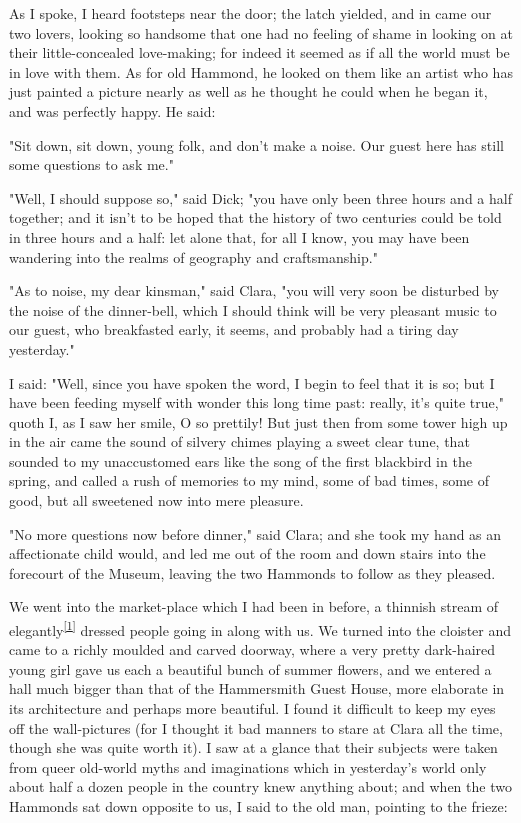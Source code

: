 As I spoke, I heard footsteps near the door; the latch yielded, and in
came our two lovers, looking so handsome that one had no feeling of
shame in looking on at their little-concealed love-making; for indeed it
seemed as if all the world must be in love with them. As for old
Hammond, he looked on them like an artist who has just painted a picture
nearly as well as he thought he could when he began it, and was
perfectly happy. He said:

"Sit down, sit down, young folk, and don't make a noise. Our guest here
has still some questions to ask me."

"Well, I should suppose so," said Dick; "you have only been three hours
and a half together; and it isn't to be hoped that the history of two
centuries could be told in three hours and a half: let alone that, for
all I know, you may have been wandering into the realms of geography and
craftsmanship."

"As to noise, my dear kinsman," said Clara, "you will very soon be
disturbed by the noise of the dinner-bell, which I should think will be
very pleasant music to our guest, who breakfasted early, it seems, and
probably had a tiring day yesterday."

I said: "Well, since you have spoken the word, I begin to feel that it
is so; but I have been feeding myself with wonder this long time past:
really, it's quite true," quoth I, as I saw her smile, O so prettily!
But just then from some tower high up in the air came the sound of
silvery chimes playing a sweet clear tune, that sounded to my
unaccustomed ears like the song of the first blackbird in the spring,
and called a rush of memories to my mind, some of bad times, some of
good, but all sweetened now into mere pleasure.

"No more questions now before dinner," said Clara; and she took my hand
as an affectionate child would, and led me out of the room and down
stairs into the forecourt of the Museum, leaving the two Hammonds to
follow as they pleased.

We went into the market-place which I had been in before, a thinnish
stream of
elegantly\textsuperscript{\protect\hyperlink{cite_note-1}{{[}1{]}}}
dressed people going in along with us. We turned into the cloister and
came to a richly moulded and carved doorway, where a very pretty
dark-haired young girl gave us each a beautiful bunch of summer flowers,
and we entered a hall much bigger than that of the Hammersmith Guest
House, more elaborate in its architecture and perhaps more beautiful. I
found it difficult to keep my eyes off the wall-pictures (for I thought
it bad manners to stare at Clara all the time, though she was quite
worth it). I saw at a glance that their subjects were taken from queer
old-world myths and imaginations which in yesterday's world only about
half a dozen people in the country knew anything about; and when the two
Hammonds sat down opposite to us, I said to the old man, pointing to the
frieze:

